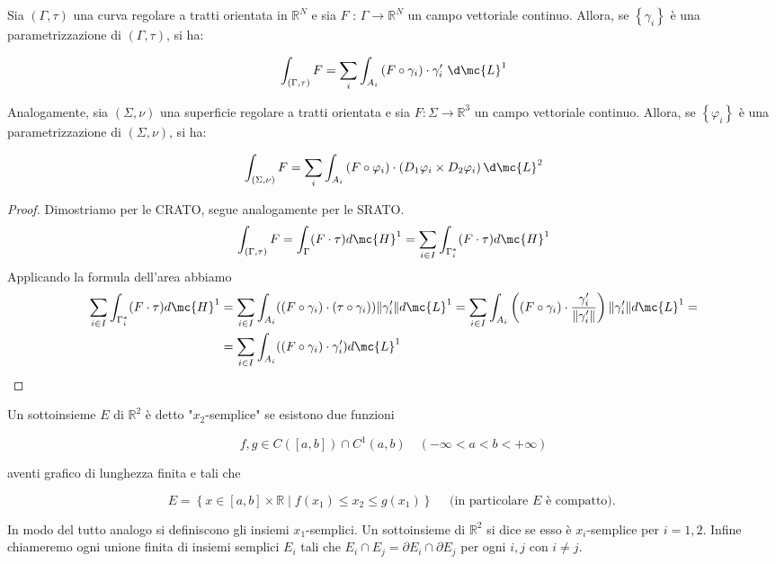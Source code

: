 \begin{proposition}[$*$]\label{prop: 2.9}
Sia $(\Gamma, \tau)$ una curva regolare a tratti orientata in $\mathbb{R}^{N}$ e sia $F$ : $\Gamma \rightarrow \mathbb{R}^{N}$ un campo vettoriale continuo. Allora, se $\left\{\gamma_{i}\right\}$ è una parametrizzazione di $(\Gamma, \tau)$, si ha:

\[
\int_{(\Gamma, \tau)} F=\sum_{i} \int_{A_{i}}\left(F \circ \gamma_{i}\right) \cdot \gamma_{i}^{\prime}\ \d \mc{L}^{1}
\]

Analogamente, sia $(\Sigma, \nu)$ una superficie regolare a tratti orientata e sia $F: \Sigma \rightarrow \mathbb{R}^{3}$ un campo vettoriale continuo. Allora, se $\left\{\varphi_{i}\right\}$ è una parametrizzazione di $(\Sigma, \nu)$, si ha:

\[
\int_{(\Sigma, \nu)} F=\sum_{i} \int_{A_{i}}\left(F \circ \varphi_{i}\right) \cdot\left(D_{1} \varphi_{i} \times D_{2} \varphi_{i}\right) \d \mc{L}^{2}
\]
\end{proposition}
\begin{proof}
    Dimostriamo per le CRATO, segue analogamente per le SRATO.
    \[\int_{(\Gamma,\tau)} F = \int_{\Gamma} (F \cdot \tau) d\mc{H}^1 = \sum_{i \in I} \int_{\Gamma_i^*} (F \cdot \tau) d\mc{H}^1\]
    Applicando la formula dell'area abbiamo 
    \begin{align*}
        \sum_{i \in I} \int_{\Gamma_i^*} (F \cdot \tau) d\mc{H}^1 & = \sum_{i \in I} \int_{A_i} ((F\circ \gamma_i) \cdot (\tau\circ \gamma_i)) \|\gamma_i'\| d\mc{L}^1 = \sum_{i \in I} \int_{A_i} \left((F\circ \gamma_i) \cdot \frac{\gamma_i'}{\|\gamma_i'\|}\right) \|\gamma_i'\| d\mc{L}^1 =\\&= \sum_{i \in I} \int_{A_i} ((F\circ \gamma_i) \cdot \gamma_i') d\mc{L}^1
    \end{align*}
\end{proof}

\begin{boxdef}
    Un sottoinsieme $E$ di $\mathbb{R}^{2}$ è detto "$x_{2}$-semplice" se esistono due funzioni

    \[
    f, g \in C([a, b]) \cap C^{1}(a, b) \quad(-\infty<a<b<+\infty)
    \]

    aventi grafico di lunghezza finita e tali che

    \[
    E=\left\{x \in[a, b] \times \mathbb{R} \mid f\left(x_{1}\right) \leq x_{2} \leq g\left(x_{1}\right)\right\} \quad \text { (in particolare } E \text { è compatto). }
    \]

    In modo del tutto analogo si definiscono gli insiemi $x_{1}$-semplici. Un sottoinsieme di $\mathbb{R}^{2}$ si dice  se esso è $x_{i}$-semplice per $i=1,2$. Infine chiameremo  ogni unione finita di insiemi semplici $E_{i}$ tali che $E_{i} \cap E_{j}=\partial E_{i} \cap \partial E_{j}$ per ogni $i, j$ con $i \neq j$.
\end{boxdef}

